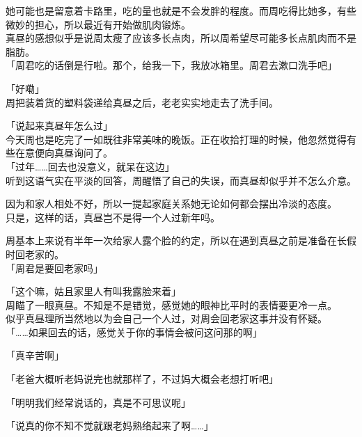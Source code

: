 她可能也是留意着卡路里，吃的量也就是不会发胖的程度。而周吃得比她多，有些微妙的担心，所以最近有开始做肌肉锻炼。\\

真昼的感想似乎是说周太瘦了应该多长点肉，所以周希望尽可能多长点肌肉而不是脂肪。\\

「周君吃的话倒是行啦。那个，给我一下，我放冰箱里。周君去漱口洗手吧」

「好嘞」\\

周把装着货的塑料袋递给真昼之后，老老实实地走去了洗手间。\\

\vspace{2\baselineskip}

「说起来真昼年怎么过」\\

今天周也是吃完了一如既往非常美味的晚饭。正在收拾打理的时候，他忽然觉得有些在意便向真昼询问了。\\

「过年……回去也没意义，就呆在这边」\\

听到这语气实在平淡的回答，周醒悟了自己的失误，而真昼却似乎并不怎么介意。

因为和家人相处不好，所以一提起家庭关系她无论如何都会摆出冷淡的态度。\\

只是，这样的话，真昼岂不是得一个人过新年吗。

周基本上来说有半年一次给家人露个脸的约定，所以在遇到真昼之前是准备在长假时回老家的。\\

「周君是要回老家吗」

「这个嘛，姑且家里人有叫我露脸来着」\\

周瞄了一眼真昼。不知是不是错觉，感觉她的眼神比平时的表情要更冷一点。\\

似乎真昼理所当然地以为会自己一个人过，对周会回老家这事并没有怀疑。\\

「……如果回去的话，感觉关于你的事情会被问这问那的啊」

「真辛苦啊」

「老爸大概听老妈说完也就那样了，不过妈大概会老想打听吧」

「明明我们经常说话的，真是不可思议呢」

「说真的你不知不觉就跟老妈熟络起来了啊……」\\

